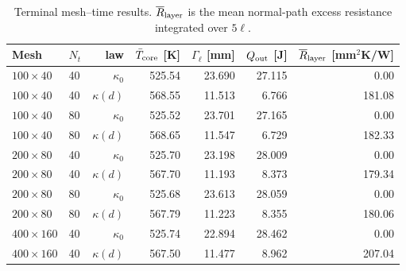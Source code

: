 \begin{table}[H]
\centering
\caption{Terminal mesh--time results. $\overline R_{\rm layer}$ is the mean normal-path excess resistance integrated over $5\ell$.}
\label{tab:primary-results}
\small
\begin{tabular}{@{}llrrrrr@{}}
\toprule
Mesh & $N_t$ & law & $\bar T_{\rm core}$ [K] & $\Gamma_\ell$ [mm] & $Q_{\rm out}$ [J] & $\overline R_{\rm layer}$ [mm$^2$K/W] \\
\midrule
$100\times40$ & 40 & $\kappa_0$ & 525.54 & 23.690 & 27.115 & 0.00 \\
$100\times40$ & 40 & $\kappa(d)$ & 568.55 & 11.513 & 6.766 & 181.08 \\
\addlinespace[1.5pt]
$100\times40$ & 80 & $\kappa_0$ & 525.52 & 23.701 & 27.165 & 0.00 \\
$100\times40$ & 80 & $\kappa(d)$ & 568.65 & 11.547 & 6.729 & 182.33 \\
\addlinespace[1.5pt]
$200\times80$ & 40 & $\kappa_0$ & 525.70 & 23.198 & 28.009 & 0.00 \\
$200\times80$ & 40 & $\kappa(d)$ & 567.70 & 11.193 & 8.373 & 179.34 \\
\addlinespace[1.5pt]
$200\times80$ & 80 & $\kappa_0$ & 525.68 & 23.613 & 28.059 & 0.00 \\
$200\times80$ & 80 & $\kappa(d)$ & 567.79 & 11.223 & 8.355 & 180.06 \\
\addlinespace[1.5pt]
$400\times160$ & 40 & $\kappa_0$ & 525.74 & 22.894 & 28.462 & 0.00 \\
$400\times160$ & 40 & $\kappa(d)$ & 567.50 & 11.477 & 8.962 & 207.04 \\
\bottomrule
\end{tabular}
\end{table}
